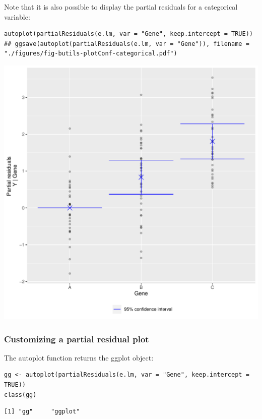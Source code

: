 \documentclass{article}
\begin{document}
Note that it is also possible to display the partial residuals for a
categorical variable:
\lstset{language=r,label= ,caption= ,captionpos=b,numbers=none}
\begin{lstlisting}
autoplot(partialResiduals(e.lm, var = "Gene", keep.intercept = TRUE))
## ggsave(autoplot(partialResiduals(e.lm, var = "Gene")), filename = "./figures/fig-butils-plotConf-categorical.pdf")
\end{lstlisting}


\begin{center}
\includegraphics[width=1\textwidth]{./figures/fig-butils-plotConf-categorical.pdf}
\end{center}

\subsubsection{Customizing a partial residual plot}
\label{sec:orgeb4eb01}

The autoplot function returns the ggplot object:
\lstset{language=r,label= ,caption= ,captionpos=b,numbers=none}
\begin{lstlisting}
gg <- autoplot(partialResiduals(e.lm, var = "Gene", keep.intercept = TRUE))
class(gg)
\end{lstlisting}

\begin{verbatim}
[1] "gg"     "ggplot"
\end{verbatim}
\end{document}
